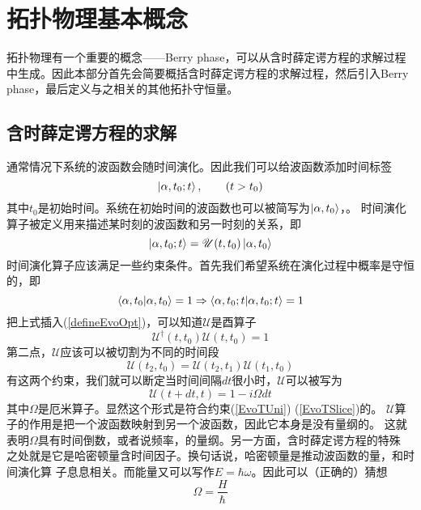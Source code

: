 \chapter{拓扑物理基本概念}
拓扑物理有一个重要的概念——Berry phase，可以从含时薛定谔方程的求解过程中生成。因此本部分首先会简要概括含时薛定谔方程的求解过程，然后引入Berry phase，最后定义与之相关的其他拓扑守恒量。
\section{含时薛定谔方程的求解}
通常情况下系统的波函数会随时间演化。因此我们可以给波函数添加时间标签
\begin{equation}
  \ket{\alpha, t_0; t}, \qquad (t > t_0)
\end{equation}
其中$t_0$是初始时间。系统在初始时间的波函数也可以被简写为$\ket{\alpha, t_0}$，。
  时间演化算子被定义用来描述某时刻的波函数和另一时刻的关系，即
  \begin{equation}
    \ket{\alpha, t_0; t} = \mathscr{U}(t, t_0)\ket{\alpha, t_0}
    \label{defineEvoOpt}
  \end{equation}
时间演化算子应该满足一些约束条件。首先我们希望系统在演化过程中概率是守恒的，即
  \begin{equation}
    \braket{\alpha, t_0 | \alpha, t_0} = 1 \Rightarrow \braket{\alpha, t_0; t | \alpha, t_0; t} = 1
  \end{equation}
把上式插入(\ref{defineEvoOpt})，可以知道$\mathscr{U}$是酉算子
\begin{equation}
  \mathscr{U}^\dagger(t, t_0)  \mathscr{U}(t, t_0) = 1
\label{EvoTUni}
\end{equation}
第二点，$\mathscr{U}$应该可以被切割为不同的时间段
\begin{equation}
\mathscr{U}(t_2, t_0) = \mathscr{U}(t_2, t_1) \mathscr{U}(t_1, t_0)
\label{EvoTSlice}
\end{equation}
有这两个约束，我们就可以断定当时间间隔$dt$很小时，$\mathscr{U}$可以被写为
\begin{equation}
\mathscr{U}(t + dt, t) = 1 - i \Omega dt
\end{equation}
其中$\Omega$是厄米算子。显然这个形式是符合约束(\ref{EvoTUni}) (\ref{EvoTSlice})的。
$\mathscr{U}$算子的作用是把一个波函数映射到另一个波函数，因此它本身是没有量纲的。
这就表明$\Omega$具有时间倒数，或者说频率，的量纲。另一方面，含时薛定谔方程的特殊
之处就是它是哈密顿量含时间因子。换句话说，哈密顿量是推动波函数的量，和时间演化算
子息息相关。而能量又可以写作$E = \hbar \omega$。因此可以（正确的）猜想
\begin{equation}
  \Omega = \frac{H}{\hbar}
\end{equation}
